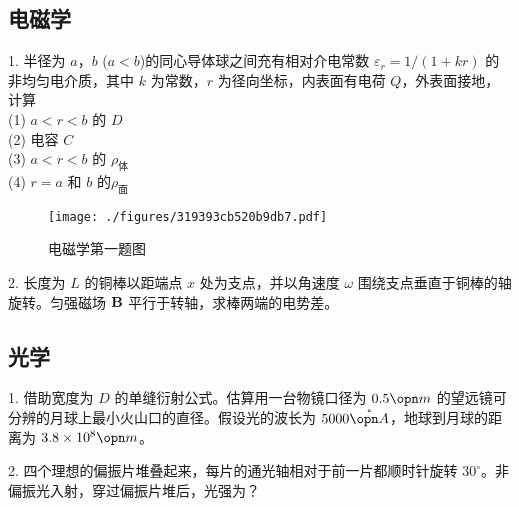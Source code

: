 \subsection{电磁学}
1. 半径为 $a$，$b$ ($a<b$)的同心导体球之间充有相对介电常数 $\varepsilon_r=1/(1+kr)$ 的非均匀电介质，其中 $k$ 为常数，$r$ 为径向坐标，内表面有电荷 $Q$，外表面接地，计算\\
(1) $ a<r<b $ 的 $D$\\
(2) 电容 $C$\\
(3) $ a<r<b $ 的 $\rho_{\text{体}}$\\
(4) $ r=a $ 和 $b$ 的$\rho_{\text{面}}$
\begin{figure}[ht]
\centering
\texttt{[image: ./figures/319393cb520b9db7.pdf]}
\caption{电磁学第一题图} \label{fig_NJU12_4}
\end{figure}
2. 长度为 $L$ 的铜棒以距端点 $x$ 处为支点，并以角速度 $\omega$ 围绕支点垂直于铜棒的轴旋转。匀强磁场 $\bf B$ 平行于转轴，求棒两端的电势差。
\subsection{光学}
1. 借助宽度为 $D$ 的单缝衍射公式。估算用一台物镜口径为 $0.5 \opn m$ 的望远镜可分辨的月球上最小火山口的直径。假设光的波长为 $5000\mathring{\opn A}$，地球到月球的距离为 $3.8\times 10^8 \opn m$。

2. 四个理想的偏振片堆叠起来，每片的通光轴相对于前一片都顺时针旋转 $30^\circ$。非偏振光入射，穿过偏振片堆后，光强为？
